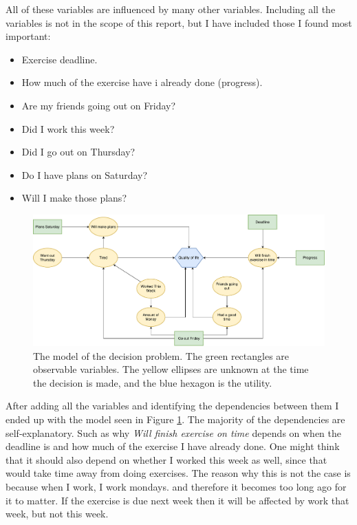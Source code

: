 \documentclass{article}
\begin{document}
    All of these variables are influenced by many other variables. Including
    all the variables is not in the scope of this report, but I have
    included those I found most important:

    \begin{itemize}
        \item Exercise deadline.
        \item How much of the exercise have i already done (progress).
        \item Are my friends going out on Friday?
        \item Did I work this week?
        \item Did I go out on Thursday?
        \item Do I have plans on Saturday?
        \item Will I make those plans?
    \end{itemize}

    \begin{figure}[ht]
        \centering
        \includegraphics[width=\linewidth]{drawing.pdf}
        \caption{The model of the decision problem. The green rectangles are
        observable variables.  The yellow ellipses are unknown at the time
        the decision is made, and the blue hexagon is the utility.}
    \label{fig:model} \end{figure}

    After adding all the variables and identifying the dependencies between
    them I ended up with the model seen in Figure \ref{fig:model}. The majority
    of the dependencies are self-explanatory. Such as why \emph{Will finish
    exercise on time} depends on when the deadline is and how much of the
    exercise I have already done. One might think that it should also depend on
    whether I worked this week as well, since that would take time away from
    doing exercises. The reason why this is not the case is because when I
    work, I work mondays. and therefore it becomes too long ago for it to
    matter. If the exercise is due next week then it will be affected by work
    that week, but not this week. 
\end{document}
